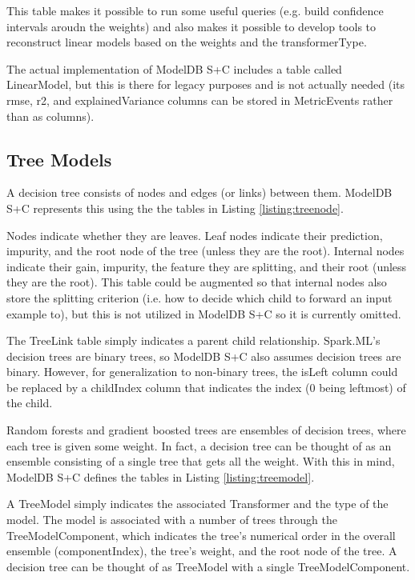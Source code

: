 This table makes it possible to run some useful queries (e.g. build confidence intervals
aroudn the weights) and also makes it possible to develop tools to reconstruct linear models
based on the weights and the transformerType.

The actual implementation of ModelDB S+C includes a table called LinearModel, but this
is there for legacy purposes and is not actually needed (its rmse, r2, and explainedVariance 
columns can be stored in MetricEvents rather than as columns).

\subsection{Tree Models}
A decision tree consists of nodes and edges (or links) between them. ModelDB S+C represents
this using the the tables in Listing \ref{listing:treenode}.

Nodes indicate whether they are leaves. Leaf nodes indicate their prediction, 
impurity, and the root node of the tree (unless they are the root). 
Internal nodes indicate their gain, impurity, the feature they are splitting, 
and their root (unless they are the root). This table could be augmented so
that internal nodes also store the splitting criterion (i.e. how to decide which
child to forward an input example to), but this is not utilized in ModelDB S+C so
it is currently omitted. 

The TreeLink table simply indicates a parent child relationship. Spark.ML's 
decision trees are binary trees, so ModelDB S+C also assumes decision trees are binary. However, for 
generalization to non-binary trees, the isLeft column could be replaced by a childIndex
column that indicates the index (0 being leftmost) of the child.

Random forests and gradient boosted trees are ensembles of decision trees, where
each tree is given some weight. In fact, a decision tree can be thought of as an
ensemble consisting of a single tree that gets all the weight. With this in mind, ModelDB S+C
defines the tables in Listing \ref{listing:treemodel}.

A TreeModel simply indicates the associated Transformer and the type of the model.
The model is associated with a number of trees through the TreeModelComponent, which
indicates the tree's numerical order in the overall ensemble (componentIndex), the
tree's weight, and the root node of the tree. A decision tree can be thought of as
TreeModel with a single TreeModelComponent.

